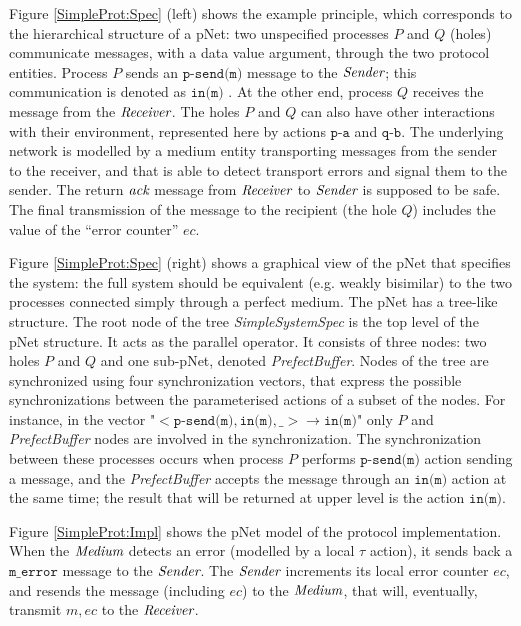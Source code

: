\documentclass{lmcs}
\newcommand{\nounderline}[1]{#1}
\begin{document}
Figure \ref{SimpleProt:Spec} (left) shows the example principle, which corresponds to the hierarchical structure of a pNet: two unspecified
processes $P$ and $Q$ (holes) communicate messages, with a data value
argument, through the two protocol entities. Process $P$ sends an $\texttt{p-send(m)}$ message to the $\symb{Sender}$; this communication is denoted as $\texttt{\nounderline{in(m)}}$%
.
At the other end, process $Q$ receives the message from the $\symb{Receiver}$. The holes $P$ and $Q$ can also have other interactions with their environment, represented here by actions $\texttt{p-a}$ and $\texttt{q-b}$. The underlying network is modelled by a medium entity transporting messages from the sender to the receiver, and that is able to detect transport errors and signal them to the sender. The return $\symb{ack}$ message from $\symb{Receiver}$ to $\symb{Sender}$ is supposed to be safe. The final transmission of the message to the recipient (the hole $Q$) includes the value of the ``error counter'' $ec$.


Figure \ref{SimpleProt:Spec} (right) shows a graphical view of the pNet that specifies the system:
the full system should be equivalent (e.g.  weakly bisimilar)
to the two processes connected simply through a perfect medium.  
The pNet has a tree-like structure.  The root node of the tree {\it SimpleSystemSpec} is the top level of the pNet structure. It acts as the parallel operator. It consists of three nodes: two holes $P$ and $Q$ and one sub-pNet, denoted {\it PrefectBuffer}. Nodes of the tree are synchronized using four synchronization vectors, that  express the possible synchronizations between the parameterised actions of a subset of the nodes. For instance, in the vector "$< \texttt{p-send(m)},\texttt{in(m)},\_> \rightarrow \texttt{\nounderline{in(m)}}$" only $P$ and {\it PrefectBuffer} nodes are involved in the synchronization. The synchronization between these processes occurs when  process $P$  performs $\texttt{p-send(m)}$  action sending a message, and  the {\it PrefectBuffer} accepts the message through an $\texttt{in(m)}$ action  at the same time; the result that will be returned at upper level is the action  $\texttt{\nounderline{in(m)}}$.


Figure \ref{SimpleProt:Impl} shows the pNet model of the protocol implementation. When the $\symb{Medium}$ detects an error (modelled by a local $\tau$ action), it sends back a $\texttt{m\_error}$ message to the $\symb{Sender}$. The $\symb{Sender}$ increments its local error counter $ec$, and resends the message (including $ec$) to the $\symb{Medium}$, that will, eventually, transmit $m,ec$ to the $\symb{Receiver}$. 
\end{document}
